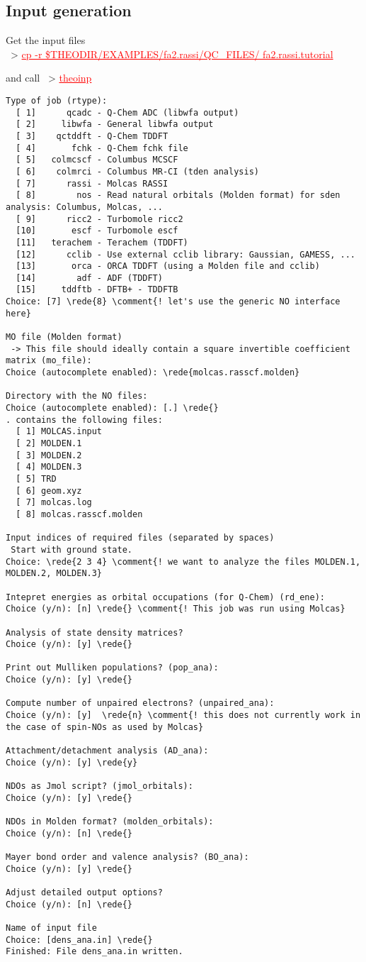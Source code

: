 \documentclass[DIV=12,headings=normal]{scrartcl}
\newcommand{\comment}[1]{\textcolor{blue}{#1}}
\newcommand{\redl}[1]{{\textcolor{red}{\underline{#1}}}}
\newcommand{\rede}[1]{\redl{#1 <ENTER>}}
\newcommand{\comm}[1]{
\small
~> \redl{#1}
\normalsize
}
\newcounter{number}
\begin{document}
\subsection{Input generation}
Get the input files \\
\comm{cp -r \$THEODIR/EXAMPLES/fa2.rassi/QC\_FILES/ fa2.rassi.tutorial}

and call \comm{theoinp}

\scriptsize
\begin{Verbatim}[commandchars=\\\{\}]
Type of job (rtype):
  [ 1]      qcadc - Q-Chem ADC (libwfa output)
  [ 2]     libwfa - General libwfa output
  [ 3]    qctddft - Q-Chem TDDFT
  [ 4]       fchk - Q-Chem fchk file
  [ 5]   colmcscf - Columbus MCSCF
  [ 6]    colmrci - Columbus MR-CI (tden analysis)
  [ 7]      rassi - Molcas RASSI
  [ 8]        nos - Read natural orbitals (Molden format) for sden analysis: Columbus, Molcas, ...
  [ 9]      ricc2 - Turbomole ricc2
  [10]       escf - Turbomole escf
  [11]   terachem - Terachem (TDDFT)
  [12]      cclib - Use external cclib library: Gaussian, GAMESS, ...
  [13]       orca - ORCA TDDFT (using a Molden file and cclib)
  [14]        adf - ADF (TDDFT)
  [15]     tddftb - DFTB+ - TDDFTB
Choice: [7] \rede{8} \comment{! let's use the generic NO interface here}

MO file (Molden format)
 -> This file should ideally contain a square invertible coefficient matrix (mo_file):
Choice (autocomplete enabled): \rede{molcas.rasscf.molden}

Directory with the NO files:
Choice (autocomplete enabled): [.] \rede{}
. contains the following files:
  [ 1] MOLCAS.input
  [ 2] MOLDEN.1
  [ 3] MOLDEN.2
  [ 4] MOLDEN.3
  [ 5] TRD
  [ 6] geom.xyz
  [ 7] molcas.log
  [ 8] molcas.rasscf.molden

Input indices of required files (separated by spaces)
 Start with ground state.
Choice: \rede{2 3 4} \comment{! we want to analyze the files MOLDEN.1, MOLDEN.2, MOLDEN.3}

Intepret energies as orbital occupations (for Q-Chem) (rd_ene):
Choice (y/n): [n] \rede{} \comment{! This job was run using Molcas}

Analysis of state density matrices?
Choice (y/n): [y] \rede{}

Print out Mulliken populations? (pop_ana):
Choice (y/n): [y] \rede{}

Compute number of unpaired electrons? (unpaired_ana):
Choice (y/n): [y]  \rede{n} \comment{! this does not currently work in the case of spin-NOs as used by Molcas}

Attachment/detachment analysis (AD_ana):
Choice (y/n): [y] \rede{y}

NDOs as Jmol script? (jmol_orbitals):
Choice (y/n): [y] \rede{}

NDOs in Molden format? (molden_orbitals):
Choice (y/n): [n] \rede{}

Mayer bond order and valence analysis? (BO_ana):
Choice (y/n): [y] \rede{}

Adjust detailed output options?
Choice (y/n): [n] \rede{}

Name of input file
Choice: [dens_ana.in] \rede{}
Finished: File dens_ana.in written.
\end{Verbatim}
\end{document}
